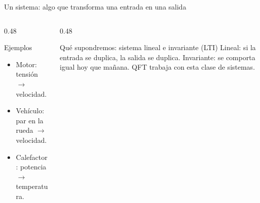 \documentclass[aspectratio=169,11pt]{beamer}
\begin{document}
\begin{frame}{Un sistema: algo que transforma una entrada en una salida}
  \centering

  \vspace{6pt}
  \begin{columns}[T]
    \begin{column}{0.48\textwidth}
      \begin{block}{Ejemplos}
        \small
        \begin{itemize}
          \item Motor: tensión $\to$ velocidad.
          \item Vehículo: par en la rueda $\to$ velocidad.
          \item Calefactor: potencia $\to$ temperatura.
        \end{itemize}
      \end{block}
    \end{column}
    \begin{column}{0.48\textwidth}
      \begin{block}{Qué supondremos: sistema lineal e invariante (LTI)}
        \small
        Lineal: si la entrada se duplica, la salida se duplica. Invariante: se comporta igual hoy que mañana. QFT trabaja con esta clase de sistemas.
      \end{block}
    \end{column}
  \end{columns}
\end{frame}
\end{document}
